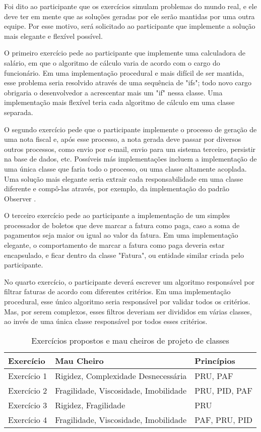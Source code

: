 Foi dito ao participante que os exercícios simulam problemas do mundo real, e ele deve
ter em mente que as soluções geradas por ele serão mantidas por uma outra equipe.
Por esse motivo, será solicitado ao participante que implemente a solução mais elegante e flexível 
possível.

O primeiro exercício pede ao participante que implemente uma calculadora de salário, em que
o algoritmo de cálculo varia de acordo com o cargo do funcionário. Em uma implementação
procedural e mais difícil de ser mantida, esse problema seria resolvido através de uma
sequência de "ifs"; todo novo cargo obrigaria o desenvolvedor a acrescentar mais um "if" 
nessa classe. Uma implementação mais flexível teria cada algoritmo de cálculo em uma 
classe separada.

O segundo exercício pede que o participante implemente o processo de geração de uma nota fiscal e, após
esse processo, a nota gerada deve passar por diversos outros processos, como envio por e-mail, envio
para um sistema terceiro, persistir na base de dados, etc. Possíveis más implementações incluem a 
implementação de uma única classe que faria todo o processo, ou uma classe altamente acoplada.
Uma solução mais elegante seria extrair cada responsabilidade em uma classe diferente e compô-las
através, por exemplo, da implementação do padrão Observer \cite{gof}.

O terceiro exercício pede ao participante a implementação de um simples processador de boletos que
deve marcar a fatura como paga, caso a soma de pagamentos seja maior ou igual ao valor da fatura. 
Em uma implementação elegante, o comportamento de marcar a fatura como paga deveria estar encapsulado, e 
ficar dentro da classe "Fatura", ou entidade similar criada pelo participante.

No quarto exercício, o participante deverá escrever um algoritmo responsável por filtrar faturas de
acordo com diferentes critérios. Em uma implementação procedural, esse único algoritmo seria
responsável por validar todos os critérios. Mas, por serem complexos, esses filtros deveriam ser divididos em 
várias classes, ao invés de uma única classe responsável por todos esses critérios.


\begin{table}
	\begin{tabular}{| l | l | l | }
		\hline
		Exercício & Mau Cheiro & Princípios\\
		
		\hline
		
		Exercício 1 & Rigidez, Complexidade Desnecessária & PRU, PAF \\
		Exercício 2 & Fragilidade, Viscosidade, Imobilidade & PRU, PID, PAF \\
		Exercício 3 & Rigidez, Fragilidade & PRU\\
		Exercício 4 & Fragilidade, Viscosidade, Imobilidade & PAF, PRU, PID \\
		
		\hline
	\end{tabular}
	\label{tab:problemas-exercicios}
	\caption{Exercícios propostos e mau cheiros de projeto de classes}
\end{table}

